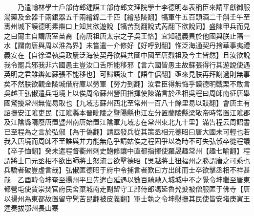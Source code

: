 　　乃遣翰林學士戶部侍郎鍾謨工部侍郎文理院學士李德明奉表稱臣來請平獻御服湯藥及金器千兩銀器五千兩繒錦二千匹【繒慈陵翻】犒軍牛五百頭酒二千斛壬午至夀州城下謨德明素辯口上知其欲遊說【犒苦到翻說式芮翻下欲說同】盛陳甲兵而見之曰爾主自謂唐室苗裔【南唐祖唐太宗之子吳王恪】宜知禮義異於他國與朕止隔一水【謂南唐與周以淮為界】未嘗遣一介修好【好呼到翻】惟泛海通契丹捨華事夷禮義安在【自徐温執吳政屢泛海使契丹欲與共圖中國至唐烈祖及今主皆然】且汝欲說我令罷兵邪我非六國愚主豈汝口舌所能移邪【言六國皆愚主故蘇張得行其遊說使遇英明之君雖辯如蘇張不能移也】可歸語汝主【語牛倨翻】亟來見朕再拜謝過則無事矣不然朕欲觀金陵城借府庫以勞軍【勞力到翻】汝君臣得無悔乎謨德明戰栗不敢言　吳越王弘俶遣兵屯境上以俟周命蘇州營田指揮使陳滿言於丞相吳程曰周師南征唐舉國驚擾常州無備易取也【九域志蘇州西北至常州一百八十餘里易以䜴翻】會唐主有詔撫安江隂吏民【江隂縣本晉毗陵之暨陽縣也江左分置蘭陵縣梁敬帝時常置江隂郡及江隂縣隋廢唐置暨州南唐始置江隂軍九域志在常州東北九十里】滿告程云周詔書已至程為之言於弘俶【為于偽翻】請亟發兵從其策丞相元德昭曰唐大國未可輕也若我入唐境而周師不至誰與并力能無危乎請姑俟之程固爭以為時不可失弘俶卒從程議【卒子恤翻】癸未遣程督衢州刺史鮑修讓中直都指揮使羅晟趣常州【趣七喻翻】程謂將士曰元丞相不欲出師將士怒流言欲擊德昭【吳越將士狃福州之勝謂唐之可乘也兵驕者破豈虚言哉】弘俶匿德昭于府中令捕言者歎曰方出師而士卒欲擊丞相不祥甚哉　乙酉韓令坤奄至揚州平旦先遣白延遇以數百騎馳入城城中不之覺令坤繼至唐東都營屯使賈崇焚官府民舍棄城南走副留守工部侍郎馮延魯髠髮被僧服匿于佛寺【唐以揚州為東都故置留守髠苦昆翻被皮義翻】軍士執之令坤慰撫其民使皆安堵庚寅王逵奏拔鄂州長山寨

